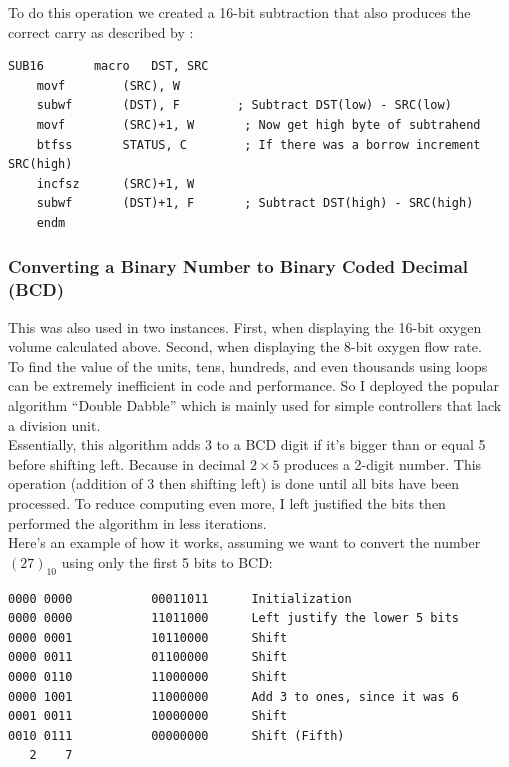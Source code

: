 \documentclass[a4paper, 12pt]{article}
\begin{document}
To do this operation we created a 16-bit subtraction that also produces the correct carry as described by \cite{sub16}:

\begin{lstlisting}
SUB16      	macro   DST, SRC
    movf    	(SRC), W
    subwf    	(DST), F    	; Subtract DST(low) - SRC(low)
    movf    	(SRC)+1, W       ; Now get high byte of subtrahend
    btfss    	STATUS, C        ; If there was a borrow increment SRC(high)
    incfsz    	(SRC)+1, W       
    subwf    	(DST)+1, F       ; Subtract DST(high) - SRC(high)
    endm
\end{lstlisting}

\subsubsection{Converting a Binary Number to Binary Coded Decimal (BCD)}
This was also used in two instances. First, when displaying the 16-bit oxygen volume calculated above. Second, when displaying the 8-bit oxygen flow rate. \\

To find the value of the units, tens, hundreds, and even thousands using loops can be extremely inefficient in code and performance. So I deployed the popular algorithm “Double Dabble” \cite{doubledabble} which is mainly used for simple controllers that lack a division unit. \\

Essentially, this algorithm adds 3 to a BCD digit if it’s bigger than or equal 5 before shifting left. Because in decimal $2 \times 5$ produces a 2-digit number. This operation (addition of 3 then shifting left) is done until all bits have been processed. To reduce computing even more, I left justified the bits then performed the algorithm in less iterations. \\


Here’s an example of how it works, assuming we want to convert the number $(27)_{10}$ using only the first 5 bits to BCD:

\begin{lstlisting}
0000 0000       	00011011      Initialization
0000 0000       	11011000      Left justify the lower 5 bits
0000 0001       	10110000      Shift
0000 0011       	01100000      Shift
0000 0110       	11000000      Shift
0000 1001      		11000000      Add 3 to ones, since it was 6
0001 0011       	10000000      Shift
0010 0111       	00000000      Shift (Fifth)
   2    7
\end{lstlisting}
\end{document}
